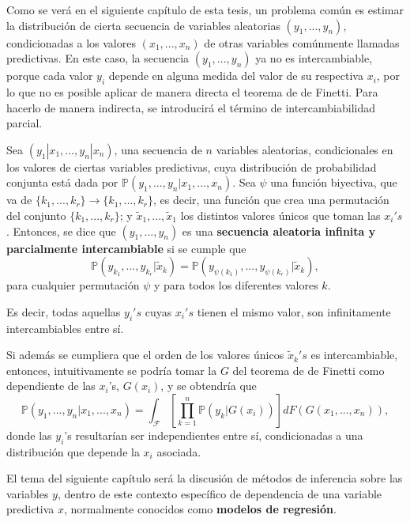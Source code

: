 Como se ver\'a en el siguiente cap\'itulo de esta tesis, un problema com\'un es estimar la distribuci\'on de cierta secuencia de variables aleatorias $(y_1,...,y_n)$, condicionadas a los valores $(x_1,...,x_n)$ de otras variables com\'unmente llamadas predictivas. En este caso, la secuencia $(y_1,...,y_n)$ ya no es intercambiable, porque cada valor $y_i$ depende en alguna medida del valor de su respectiva $x_i$, por lo que no es posible aplicar de manera directa el teorema de de Finetti. Para hacerlo de manera indirecta, se introducir\'a el t\'ermino de intercambiabilidad parcial.

\begin{defin*}
    Sea $(y_1|x_1,...,y_n|x_n)$, una secuencia de $n$ variables aleatorias, condicionales en los valores de ciertas variables predictivas, cuya distribuci\'on de probabilidad conjunta est\'a dada por $\mathbb{
    P}(y_1,...,y_n|x_1,...,x_n)$. Sea $\psi$ una funci\'on biyectiva, que va de $\{k_1,...,k_r\} \rightarrow \{k_1,...,k_r\}$, es decir, una funci\'on que crea una permutaci\'on del conjunto $\{k_1,...,k_r\}$; y $\tilde{x}_1,..., \tilde{x}_1$ los distintos valores \'unicos que toman las $x_i's$.  
    Entonces, se dice que $(y_1,...,y_n)$ es una \textbf{secuencia aleatoria infinita y parcialmente intercambiable} si se cumple que 
    \begin{equation*}
        \mathbb{P}(y_{k_1},...,y_{k_r}|\tilde{x}_k) = \mathbb{P}(y_{\psi(k_1)},...,y_{\psi(k_r)}|\tilde{x}_k),
    \end{equation*}
    para cualquier permutaci\'on $\psi$ y para todos los diferentes valores $k$.
    
    Es decir, todas aquellas $y_i's$ cuyas $x_i's$ tienen el mismo valor, son infinitamente intercambiables entre s\'i. 
\end{defin*}

Si adem\'as se cumpliera que el orden de los valores \'unicos $\tilde{x}_k's$ es intercambiable, entonces, intuitivamente se podr\'ia tomar la $G$ del teorema de de Finetti como dependiente de las $x_i$'s, $G(x_i)$, y se obtendr\'ia que
\begin{equation*}
    \mathbb{P}(y_1, ...,y_n|x_1,...,x_n) =
    \int_{\mathcal{F}}\left[\prod_{k=1}^n \mathbb{P}(y_k|G(x_i))\right]dF(G(x_1,...,x_n)),
\end{equation*}
donde las $y_i$'s resultar\'ian ser independientes entre s\'i, condicionadas a una distribuci\'on que depende la $x_i$ asociada.

El tema del siguiente cap\'itulo ser\'a la discusi\'on de m\'etodos de inferencia sobre las variables $y$, dentro de este contexto espec\'ifico de dependencia de una variable predictiva $x$, normalmente conocidos como \textbf{modelos de regresi\'on}.

\newpage